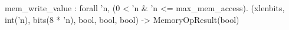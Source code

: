 mem_write_value : forall 'n, (0 < 'n & 'n <= max_mem_access).
  (xlenbits, int('n), bits(8 * 'n), bool, bool, bool) -> MemoryOpResult(bool)